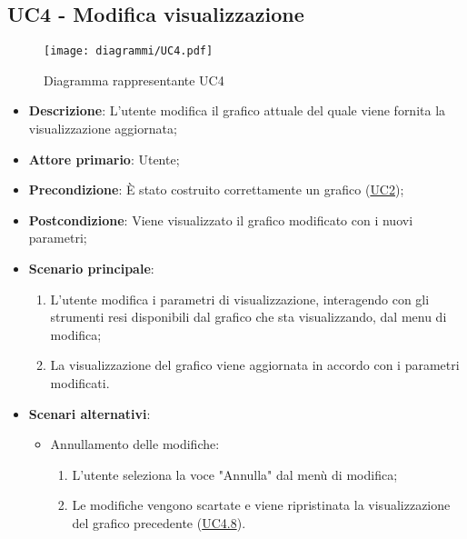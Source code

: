 \subsection{UC4 - Modifica visualizzazione}
\label{sub:uc4}

\begin{figure}[h]
    \centering
    \texttt{[image: diagrammi/UC4.pdf]}
    \caption{Diagramma rappresentante UC4}
    \label{fig:UC4}
\end{figure}


\begin{itemize}
    \item \textbf{Descrizione}: L’utente modifica il grafico attuale del quale viene fornita la visualizzazione 
    aggiornata;

    \item \textbf{Attore primario}: Utente;

    \item \textbf{Precondizione}:   È stato costruito correttamente un grafico (\hyperref[sub:uc2]{UC2});

    \item \textbf{Postcondizione}:  Viene visualizzato il grafico modificato con i nuovi parametri;

	\item \textbf{Scenario principale}:
		\begin{enumerate}
            \item L'utente modifica i parametri di visualizzazione, interagendo con gli strumenti resi disponibili dal 
            grafico che sta visualizzando, dal menu di modifica;
            \item La visualizzazione del grafico viene aggiornata in accordo con i parametri modificati.
        \end{enumerate}

    \item \textbf{Scenari alternativi}:
    \begin{itemize}
        \item Annullamento delle modifiche:
        \begin{enumerate}
            \item L'utente seleziona la voce "Annulla" dal menù di modifica;
            \item Le modifiche vengono scartate e viene ripristinata la visualizzazione del grafico precedente 
            (\hyperref[ssub:uc4.8]{UC4.8}).
        \end{enumerate}
    \end{itemize}

\end{itemize}

